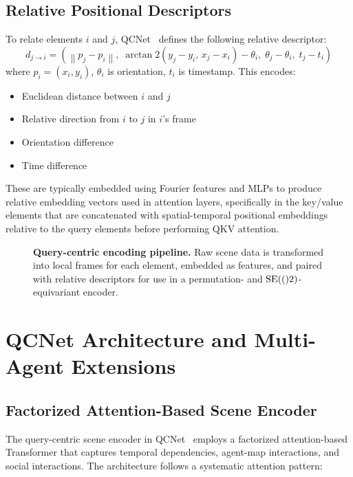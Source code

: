 \subsection{Relative Positional Descriptors}
To relate elements $i$ and $j$, QCNet~\cite{Zhou2023QueryCentric} defines the following relative descriptor:
\begin{equation}
\label{eq:relative_descriptor_v2}
d_{j \to i} = \left(
    \left\| p_j - p_i \right\|,\;
    \arctan2(y_j - y_i,\, x_j - x_i) - \theta_i,\;
    \theta_j - \theta_i,\;
    t_j - t_i
\right)
\end{equation}
where $p_i = (x_i, y_i)$, $\theta_i$ is orientation, $t_i$ is timestamp. This encodes:
\begin{itemize}
    \item Euclidean distance between $i$ and $j$
    \item Relative direction from $i$ to $j$ in $i$'s frame
    \item Orientation difference
    \item Time difference
\end{itemize}
These are typically embedded using Fourier features and MLPs to produce relative embedding vectors used in attention layers, specifically in the key/value elements that are concatenated with spatial-temporal positional embeddings relative to the query elements before performing QKV attention.

\begin{figure}[t]
\centering
\caption[Query-Centric Encoding Pipeline]{\textbf{Query-centric encoding pipeline.} Raw scene data is transformed into local frames for each element, embedded as features, and paired with relative descriptors for use in a permutation- and $\mathrm{SE}(()2)$-equivariant encoder.}
\label{fig:query_pipeline}
\end{figure}

\section{QCNet Architecture and Multi-Agent Extensions}

\subsection{Factorized Attention-Based Scene Encoder}
The query-centric scene encoder in QCNet~\cite{Zhou2023QueryCentric} employs a factorized attention-based Transformer that captures temporal dependencies, agent-map interactions, and social interactions. The architecture follows a systematic attention pattern:

